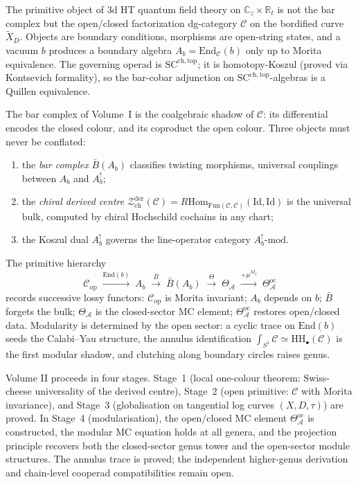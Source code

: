 \documentclass[11pt,reqno]{amsart}
\theoremstyle{definition}
\theoremstyle{remark}
\providecommand{\cA}{\mathcal{A}}
\providecommand{\cC}{\mathcal{C}}
\providecommand{\cZ}{\mathcal{Z}}
\providecommand{\barB}{\bar{B}}
\providecommand{\Hom}{\mathrm{Hom}}
\providecommand{\bC}{\mathbb{C}}
\providecommand{\bR}{\mathbb{R}}
\providecommand{\SCchtop}{\mathrm{SC}^{\mathrm{ch,top}}}
\providecommand{\HH}{\mathrm{HH}}
\providecommand{\Fun}{\mathrm{Fun}}
\providecommand{\End}{\mathrm{End}}
\providecommand{\der}{\mathrm{der}}
\providecommand{\ch}{\mathrm{ch}}
\providecommand{\op}{\mathrm{op}}
\providecommand{\oc}{\mathrm{oc}}
\providecommand{\Id}{\mathrm{Id}}
\numberwithin{equation}{section}
\begin{document}
The primitive object of 3d HT quantum field theory on
$\bC_z \times \bR_t$ is not the bar complex but the open/closed
factorization dg-category $\cC$ on the bordified curve
$\widetilde X_D$. Objects are boundary conditions, morphisms
are open-string states, and a vacuum $b$ produces a boundary
algebra $A_b = \End_\cC(b)$ only up to Morita equivalence. The
governing operad is $\SCchtop$; it is homotopy-Koszul (proved
via Kontsevich formality), so the bar-cobar adjunction on
$\SCchtop$-algebras is a Quillen equivalence.

The bar complex of Volume~I is the coalgebraic shadow of $\cC$:
its differential encodes the closed colour, and its coproduct
the open colour. Three objects must never be conflated:
\begin{enumerate}[label=\textup{(\roman*)},nosep]
\item the \emph{bar complex} $\barB(A_b)$ classifies twisting
morphisms, universal couplings between $A_b$ and $A_b^!$;
\item the \emph{chiral derived centre}
$\cZ^{\der}_{\ch}(\cC) =
R\Hom_{\Fun(\cC,\cC)}(\Id, \Id)$ is the universal bulk,
computed by chiral Hochschild cochains in any chart;
\item the Koszul dual $A_b^!$ governs the line-operator
category $A_b^!\text{-mod}$.
\end{enumerate}
The primitive hierarchy
\[
\cC_{\op}
\;\xrightarrow{\End(b)}\;
A_b
\;\xrightarrow{\barB}\;
\barB(A_b)
\;\xrightarrow{\Theta}\;
\Theta_\cA
\;\xrightarrow{+\mu^{M_j}}\;
\Theta^{\oc}_\cA
\]
records successive lossy functors: $\cC_{\op}$ is Morita
invariant; $A_b$ depends on $b$; $\barB$ forgets the bulk;
$\Theta_\cA$ is the closed-sector MC element;
$\Theta^{\oc}_\cA$ restores open/closed data. Modularity is
determined by the open sector: a cyclic trace on $\End(b)$
seeds the Calabi--Yau structure, the annulus identification
$\int_{S^1} \cC \simeq \HH_\bullet(\cC)$ is the first modular
shadow, and clutching along boundary circles raises genus.

Volume II proceeds in four stages. Stage~1 (local one-colour
theorem: Swiss-cheese universality of the derived centre),
Stage~2 (open primitive: $\cC$ with Morita invariance), and
Stage~3 (globalisation on tangential log curves $(X, D, \tau)$)
are proved. In Stage~4 (modularisation), the open/closed MC
element $\Theta^{\oc}_\cA$ is constructed, the modular MC
equation holds at all genera, and the projection principle
recovers both the closed-sector genus tower and the
open-sector module structures. The annulus trace is proved;
the independent higher-genus derivation and chain-level
cooperad compatibilities remain open.
\end{document}
